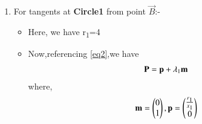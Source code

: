 \documentclass[journal,12pt,twocolumn]{IEEEtran}
\begin{document}
\begin{enumerate}
\begin{proof}
\begin{itemize}
\begin{align}
 \end{align}
\item Now,using \eqref{eq1} in above equation we get:
\begin{align}
    \implies  \myvec{x\textsubscript{1}&0}\vec{N} &=r\textsubscript{n}^2 
    \\
    \implies   \myvec{1&0}\vec{N} &=\myvec{\frac{r\textsubscript{n}^2}{x\textsubscript{1}}\\0} 
    \\
    \implies \vec{N}&=\myvec{\frac{r\textsubscript{n}^2}{x\textsubscript{1}}\\0} +\lambda\myvec{0\\1}
  \\
    \implies \vec{N}&=\vec{n}+\lambda\vec{m} 
   \end{align}
    \begin{align}
   \text{where, }\vec{n}&=\myvec{\frac{r\textsubscript{n}^2}{x\textsubscript{1}}\\0} \text{and }\vec{m}=\myvec{0\\1}
   \end{align}
\item Also we know,
\begin{align}
\norm{\vec{n}+\lambda\vec{m}}^2&=r\textsubscript{n}^2
\\
(\vec{n}+\lambda \vec{m})^T(\vec{n}+\lambda \vec{m})&=r\textsubscript{n}^2
\end{align}
\begin{align}
\lambda^2&=\frac{r\textsubscript{n}^2-\norm{\vec{n}}^2}{\norm{\vec{m}}^2}
\\
\lambda &= \pm \sqrt{\frac{r\textsubscript{n}^2-\norm{\vec{n}}^2}{\norm{\vec{m}}^2}} 
\end{align}
\end{itemize}
\end{proof}
\item For tangents at \textbf{Circle1} from point $\vec{B}$:-
\begin{itemize}
\item Here, we have r\textsubscript{1}=4
\item Now,referencing \eqref{eq2},we have
\begin{align}
 \vec{P}=\vec{p}+\lambda\textsubscript{1}\vec{m}   \label{eqa}
\end{align}
where,
\begin{align}
 \vec{m}=\myvec{0\\1},\vec{p}=\myvec{\frac{r\textsubscript{1}}{x\textsubscript{1}}\\0}

\end{align}
\end{itemize}
\end{enumerate}
\end{document}
